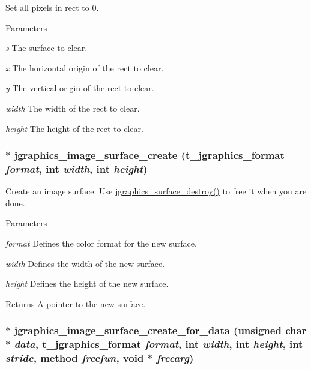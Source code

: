 Set all pixels in rect to 0. 
\begin{DoxyParams}{Parameters}
\item[{\em s}]The surface to clear. \item[{\em x}]The horizontal origin of the rect to clear. \item[{\em y}]The vertical origin of the rect to clear. \item[{\em width}]The width of the rect to clear. \item[{\em height}]The height of the rect to clear. \end{DoxyParams}
\hypertarget{group__jsurface_gaee5d0e140bdbece63abd62d60f44f96d}{
\subsubsection[{jgraphics\_\-image\_\-surface\_\-create}]{$\ast$ jgraphics\_\-image\_\-surface\_\-create ({\bf t\_\-jgraphics\_\-format} {\em format}, \/  int {\em width}, \/  int {\em height})}}
\label{group__jsurface_gaee5d0e140bdbece63abd62d60f44f96d}


Create an image surface. Use \hyperlink{group__jsurface_ga0fb843ca88d59c3a1c933b18cca41524}{jgraphics\_\-surface\_\-destroy()} to free it when you are done.


\begin{DoxyParams}{Parameters}
\item[{\em format}]Defines the color format for the new surface. \item[{\em width}]Defines the width of the new surface. \item[{\em height}]Defines the height of the new surface. \end{DoxyParams}
\begin{DoxyReturn}{Returns}
A pointer to the new surface. 
\end{DoxyReturn}
\hypertarget{group__jsurface_ga315abd7050ef53566df8fbcec80182af}{
\subsubsection[{jgraphics\_\-image\_\-surface\_\-create\_\-for\_\-data}]{$\ast$ jgraphics\_\-image\_\-surface\_\-create\_\-for\_\-data (unsigned char $\ast$ {\em data}, \/  {\bf t\_\-jgraphics\_\-format} {\em format}, \/  int {\em width}, \/  int {\em height}, \/  int {\em stride}, \/  {\bf method} {\em freefun}, \/  void $\ast$ {\em freearg})}}
\label{group__jsurface_ga315abd7050ef53566df8fbcec80182af}


